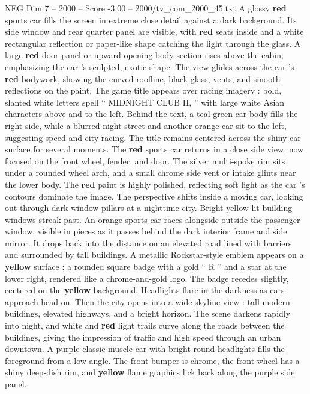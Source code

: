 \begin{textsample}{NEG Dim 7 – 2000 – Score -3.00 – 2000/tv\_com\_2000\_45.txt}  \label{ex:f7_neg_030}
A glossy \textbf{red} sports car fills the screen in extreme close detail against a dark background.
Its side window and rear quarter panel are visible, with \textbf{red} seats inside and a white rectangular reflection or paper-like shape catching the light through the glass.
A large \textbf{red} door panel or upward-opening body section rises above the cabin, emphasizing the car ’s sculpted, exotic shape.
The view glides across the car ’s \textbf{red} bodywork, showing the curved roofline, black glass, vents, and smooth reflections on the paint.
The game title appears over racing imagery : bold, slanted white letters spell “ MIDNIGHT CLUB II, ” with large white Asian characters above and to the left.
Behind the text, a teal-green car body fills the right side, while a blurred night street and another orange car sit to the left, suggesting speed and city racing.
The title remains centered across the shiny car surface for several moments.
The \textbf{red} sports car returns in a close side view, now focused on the front wheel, fender, and door.
The silver multi-spoke rim sits under a rounded wheel arch, and a small chrome side vent or intake glints near the lower body.
The \textbf{red} paint is highly polished, reflecting soft light as the car ’s contours dominate the image.
The perspective shifts inside a moving car, looking out through dark window pillars at a nighttime city.
Bright yellow-lit building windows streak past.
An orange sports car races alongside outside the passenger window, visible in pieces as it passes behind the dark interior frame and side mirror.
It drops back into the distance on an elevated road lined with barriers and surrounded by tall buildings.
A metallic Rockstar-style emblem appears on a \textbf{yellow} surface : a rounded square badge with a gold “ R ” and a star at the lower right, rendered like a chrome-and-gold logo.
The badge recedes slightly, centered on the \textbf{yellow} background.
Headlights flare in the darkness as cars approach head-on.
Then the city opens into a wide skyline view : tall modern buildings, elevated highways, and a bright horizon.
The scene darkens rapidly into night, and white and \textbf{red} light trails curve along the roads between the buildings, giving the impression of traffic and high speed through an urban downtown.
A purple classic muscle car with bright round headlights fills the foreground from a low angle.
The front bumper is chrome, the front wheel has a shiny deep-dish rim, and \textbf{yellow} flame graphics lick back along the purple side panel.

\end{textsample}
